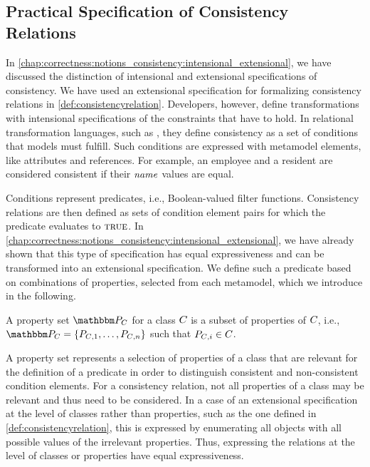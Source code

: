 \subsection{Practical Specification of Consistency Relations}

In \autoref{chap:correctness:notions_consistency:intensional_extensional}, we have discussed the distinction of intensional and extensional specifications of consistency.
We have used an extensional specification for formalizing consistency relations in \autoref{def:consistencyrelation}.
Developers, however, define transformations with intensional specifications of the constraints that have to hold.
In relational transformation languages, such as \qvtr, they define consistency as a set of conditions that models must fulfill.
Such conditions are expressed with metamodel elements, like attributes and references.
For example, an employee and a resident are considered consistent if their $\mathit{name}$ values are equal.

Conditions represent predicates, i.e., Boolean-valued filter functions.
Consistency relations are then defined as sets of condition element pairs for which the predicate evaluates to $\textsc{true}$.
In \autoref{chap:correctness:notions_consistency:intensional_extensional}, we have already shown that this type of specification has equal expressiveness and can be transformed into an extensional specification.
We define such a predicate based on combinations of properties, selected from each metamodel, which we introduce in the following.

\begin{definition}
A property set $\propertyset{P}{\class{C}{}}$ for a class $\class{C}{}$ is a subset of properties of $\class{C}{}$, i.e., $\propertyset{P}{\class{C}{}} = \setted{P_{\class{C}{}, 1}, \dots, P_{\class{C}{}, n}}$ such that $P_{\class{C}{}, i} \in \class{C}{}$.
\end{definition}

A property set represents a selection of properties of a class that are relevant for the definition of a predicate in order to distinguish consistent and non-consistent condition elements. For a consistency relation, not all properties of a class may be relevant and thus need to be considered. In a case of an extensional specification at the level of classes rather than properties, such as the one defined in \autoref{def:consistencyrelation}, this is expressed by enumerating all objects with all possible values of the irrelevant properties. Thus, expressing the relations at the level of classes or properties have equal expressiveness.

